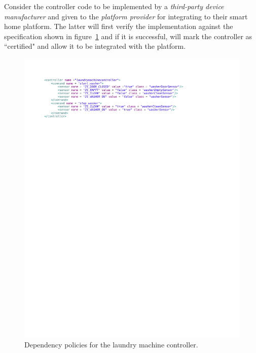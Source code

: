 \documentclass{article}
\begin{document}
Consider the controller code to be implemented by a \textit{third-party device manufacturer} and given to the \textit{platform provider} for integrating to their smart home platform. The latter will first verify the implementation against the specification shown in figure~\ref{fig:policy} and if it is successful, will mark the controller as ``certified" and allow it to be integrated with the platform.\\

\begin{figure}[h]
\begin{center}
\includegraphics[scale=0.7, trim = 0 21.9cm 0 3cm]{policy.pdf}
\caption{Dependency policies for the laundry machine controller.}
\label{fig:policy}
\end{center}
\end{figure}
\end{document}
